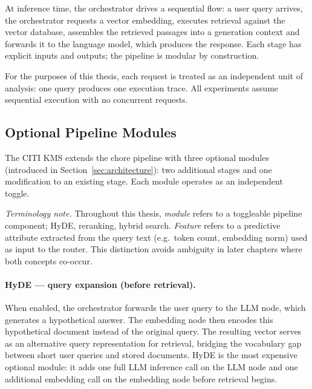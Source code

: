 At inference time, the orchestrator drives a sequential flow: a user query arrives, 
the orchestrator requests a vector embedding, executes retrieval against the vector 
database, assembles the retrieved passages into a generation context and forwards it 
to the language model, which produces the response. Each stage has explicit inputs and 
outputs; the pipeline is modular by construction.



For the purposes of this thesis, each request is treated as an independent unit of analysis: 
one query produces one execution trace. All experiments assume sequential execution with no 
concurrent requests.


\subsection{Optional Pipeline Modules}
\label{subsec:modules}

The CITI KMS extends the chore pipeline with three optional modules (introduced in Section~\ref{sec:architecture}):
two additional stages and one modification to an existing stage. Each module operates as
an independent toggle.

\medskip
\noindent\textit{Terminology note.}
Throughout this thesis, \emph{module} refers to a toggleable pipeline component; 
HyDE, reranking, hybrid search. \emph{Feature} refers to a predictive attribute
extracted from the query text (e.g.\ token count, embedding norm) used as input
to the router. This distinction avoids ambiguity in later chapters where both
concepts co-occur.


\paragraph{HyDE --- query expansion (before retrieval).}
When enabled, the orchestrator forwards the user query to the LLM node, which generates
a hypothetical answer. The embedding node then encodes this hypothetical document instead
of the original query. The resulting vector serves as an alternative query representation
for retrieval, bridging the vocabulary gap between short user queries and stored
documents. HyDE is the most expensive optional module: it adds one full LLM inference
call on the LLM node and one additional embedding call on the embedding node before
retrieval begins.

